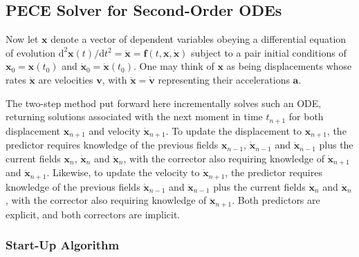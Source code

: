 \subsection{PECE Solver for Second-Order ODEs}
\label{sec:2ndOrderPECE}

Now let $\mathbf{x}$ denote a vector of dependent variables obeying a differential equation of evolution $\mathrm{d}^2 \mathbf{x}(t) / \mathrm{d} t^2 = \ddot{\mathbf{x}} = \mathbf{f} (t, \mathbf{x}, \dot{\mathbf{x}})$ subject to a pair  initial conditions of $\mathbf{x}_0 = \mathbf{x}(t_0)$ and $\dot{\mathbf{x}}_0 = \dot{\mathbf{x}}(t_0)$.  One may think of $\mathbf{x}$ as being displacements whose rates $\dot{\mathbf{x}}$ are velocities $\mathbf{v}$, with $\ddot{\mathbf{x}} = \dot{\mathbf{v}}$ representing their accelerations $\mathbf{a}$. 

The two-step method put forward here incrementally solves such an ODE, returning solutions associated with the next moment in time $t_{n+1}$ for both displacement $\mathbf{x}_{n+1}$ and velocity $\dot{\mathbf{x}}_{n+1}$.  To update the displacement to $\mathbf{x}_{n+1}$, the predictor requires knowledge of the previous fields $\mathbf{x}_{n-1}$, $\dot{\mathbf{x}}_{n-1}$ and $\ddot{\mathbf{x}}_{n-1}$ plus the current fields $\mathbf{x}_n$, $\dot{\mathbf{x}}_n$ and $\ddot{\mathbf{x}}_n$, with the corrector also requiring knowledge of $\dot{\mathbf{x}}_{n+1}$ and $\ddot{\mathbf{x}}_{n+1}$.  Likewise, to update the velocity to $\dot{\mathbf{x}}_{n+1}$, the predictor requires knowledge of the previous fields $\dot{\mathbf{x}}_{n-1}$ and $\ddot{\mathbf{x}}_{n-1}$ plus the current fields $\dot{\mathbf{x}}_n$ and $\ddot{\mathbf{x}}_n$, with the corrector also requiring knowledge of $\ddot{\mathbf{x}}_{n+1}$.  Both predictors are explicit, and both correctors are implicit.

\subsubsection{Start-Up Algorithm}

